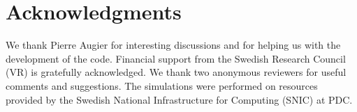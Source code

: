 
%
%
 
%

\section*{Acknowledgments}
We thank  Pierre Augier  for interesting discussions and for helping us with the development of the code. Financial support from the Swedish Research Council (VR) is gratefully acknowledged. We thank two anonymous reviewers for useful comments and suggestions. 
The simulations were performed on resources provided by the Swedish National Infrastructure for Computing (SNIC)  at  PDC.



% 

% 
%
